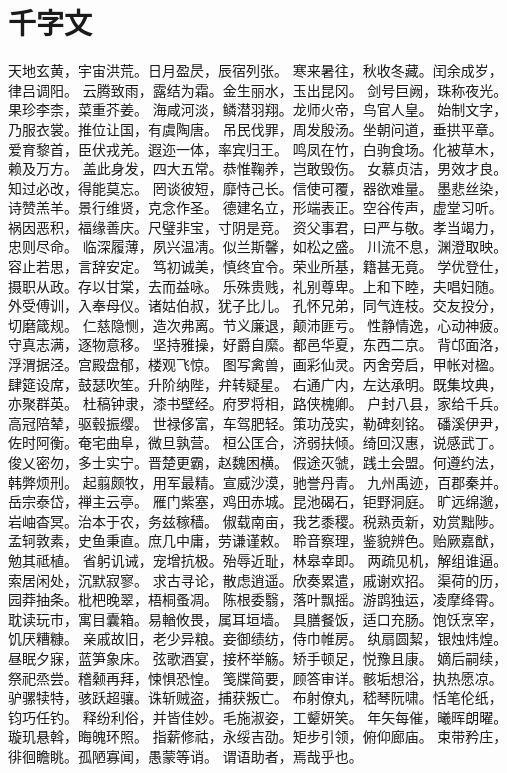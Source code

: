 \documentclass{article}
\begin{document}
\section{千字文}
天地玄黄，宇宙洪荒。日月盈昃，辰宿列张。
寒来暑往，秋收冬藏。闰余成岁，律吕调阳。
云腾致雨，露结为霜。金生丽水，玉出昆冈。
剑号巨阙，珠称夜光。果珍李柰，菜重芥姜。
海咸河淡，鳞潜羽翔。龙师火帝，鸟官人皇。
始制文字，乃服衣裳。推位让国，有虞陶唐。
吊民伐罪，周发殷汤。坐朝问道，垂拱平章。
爱育黎首，臣伏戎羌。遐迩一体，率宾归王。
鸣凤在竹，白驹食场。化被草木，赖及万方。
盖此身发，四大五常。恭惟鞠养，岂敢毁伤。
女慕贞洁，男效才良。知过必改，得能莫忘。
罔谈彼短，靡恃己长。信使可覆，器欲难量。
墨悲丝染，诗赞羔羊。景行维贤，克念作圣。
德建名立，形端表正。空谷传声，虚堂习听。
祸因恶积，福缘善庆。尺璧非宝，寸阴是竞。
资父事君，曰严与敬。孝当竭力，忠则尽命。
临深履薄，夙兴温凊。似兰斯馨，如松之盛。
川流不息，渊澄取映。容止若思，言辞安定。
笃初诚美，慎终宜令。荣业所基，籍甚无竟。
学优登仕，摄职从政。存以甘棠，去而益咏。
乐殊贵贱，礼别尊卑。上和下睦，夫唱妇随。
外受傅训，入奉母仪。诸姑伯叔，犹子比儿。
孔怀兄弟，同气连枝。交友投分，切磨箴规。
仁慈隐恻，造次弗离。节义廉退，颠沛匪亏。
性静情逸，心动神疲。守真志满，逐物意移。
坚持雅操，好爵自縻。都邑华夏，东西二京。
背邙面洛，浮渭据泾。宫殿盘郁，楼观飞惊。
图写禽兽，画彩仙灵。丙舍旁启，甲帐对楹。
肆筵设席，鼓瑟吹笙。升阶纳陛，弁转疑星。
右通广内，左达承明。既集坟典，亦聚群英。
杜稿钟隶，漆书壁经。府罗将相，路侠槐卿。
户封八县，家给千兵。高冠陪辇，驱毂振缨。
世禄侈富，车驾肥轻。策功茂实，勒碑刻铭。
磻溪伊尹，佐时阿衡。奄宅曲阜，微旦孰营。
桓公匡合，济弱扶倾。绮回汉惠，说感武丁。
俊乂密勿，多士实宁。晋楚更霸，赵魏困横。
假途灭虢，践土会盟。何遵约法，韩弊烦刑。
起翦颇牧，用军最精。宣威沙漠，驰誉丹青。
九州禹迹，百郡秦并。岳宗泰岱，禅主云亭。
雁门紫塞，鸡田赤城。昆池碣石，钜野洞庭。
旷远绵邈，岩岫杳冥。治本于农，务兹稼穑。
俶载南亩，我艺黍稷。税熟贡新，劝赏黜陟。
孟轲敦素，史鱼秉直。庶几中庸，劳谦谨敕。
聆音察理，鉴貌辨色。贻厥嘉猷，勉其祗植。
省躬讥诫，宠增抗极。殆辱近耻，林皋幸即。
两疏见机，解组谁逼。索居闲处，沉默寂寥。
求古寻论，散虑逍遥。欣奏累遣，戚谢欢招。
渠荷的历，园莽抽条。枇杷晚翠，梧桐蚤凋。
陈根委翳，落叶飘摇。游鹍独运，凌摩绛霄。
耽读玩市，寓目囊箱。易輶攸畏，属耳垣墙。
具膳餐饭，适口充肠。饱饫烹宰，饥厌糟糠。
亲戚故旧，老少异粮。妾御绩纺，侍巾帷房。
纨扇圆絜，银烛炜煌。昼眠夕寐，蓝笋象床。
弦歌酒宴，接杯举觞。矫手顿足，悦豫且康。
嫡后嗣续，祭祀烝尝。稽颡再拜，悚惧恐惶。
笺牒简要，顾答审详。骸垢想浴，执热愿凉。
驴骡犊特，骇跃超骧。诛斩贼盗，捕获叛亡。
布射僚丸，嵇琴阮啸。恬笔伦纸，钧巧任钓。
释纷利俗，并皆佳妙。毛施淑姿，工颦妍笑。
年矢每催，曦晖朗曜。璇玑悬斡，晦魄环照。
指薪修祜，永绥吉劭。矩步引领，俯仰廊庙。
束带矜庄，徘徊瞻眺。孤陋寡闻，愚蒙等诮。
谓语助者，焉哉乎也。
\end{document}
